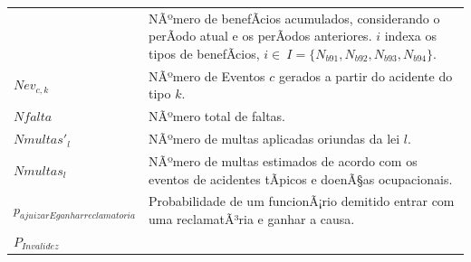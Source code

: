 \documentclass[]{article}
\begin{document}
\begin{longtable}[]{@{}ll@{}}
\begin{minipage}[t]{0.07\columnwidth}
\end{minipage} & \begin{minipage}[t]{0.87\columnwidth}\raggedright\strut
NÃºmero de benefÃ­cios acumulados, considerando o perÃ­odo atual e os
perÃ­odos anteriores. \(i\) indexa os tipos de benefÃ­cios,
\(i \in \ I =\{N_{b91}, N_{b92}, N_{b93}, N_{b94}\}\).\strut
\end{minipage}\tabularnewline
\begin{minipage}[t]{0.07\columnwidth}\raggedright\strut
\(Nev_{c,k}\)\strut
\end{minipage} & \begin{minipage}[t]{0.87\columnwidth}\raggedright\strut
NÃºmero de Eventos \(c\) gerados a partir do acidente do tipo
\(k\).\strut
\end{minipage}\tabularnewline
\begin{minipage}[t]{0.07\columnwidth}\raggedright\strut
\(Nfalta\)\strut
\end{minipage} & \begin{minipage}[t]{0.87\columnwidth}\raggedright\strut
NÃºmero total de faltas.\strut
\end{minipage}\tabularnewline
\begin{minipage}[t]{0.07\columnwidth}\raggedright\strut
\(Nmultas'_{l}\)\strut
\end{minipage} & \begin{minipage}[t]{0.87\columnwidth}\raggedright\strut
NÃºmero de multas aplicadas oriundas da lei \(l\).\strut
\end{minipage}\tabularnewline
\begin{minipage}[t]{0.07\columnwidth}\raggedright\strut
\(Nmultas_{l}\)\strut
\end{minipage} & \begin{minipage}[t]{0.87\columnwidth}\raggedright\strut
NÃºmero de multas estimados de acordo com os eventos de acidentes
tÃ­picos e doenÃ§as ocupacionais.\strut
\end{minipage}\tabularnewline
\begin{minipage}[t]{0.07\columnwidth}\raggedright\strut
\(p_{ajuizarEganharreclamatoria}\)\strut
\end{minipage} & \begin{minipage}[t]{0.87\columnwidth}\raggedright\strut
Probabilidade de um funcionÃ¡rio demitido entrar com uma reclamatÃ³ria e
ganhar a causa.\strut
\end{minipage}\tabularnewline
\begin{minipage}[t]{0.07\columnwidth}\raggedright\strut
\(P_{Invalidez}\)\strut

\end{minipage}
\end{longtable}
\end{document}
